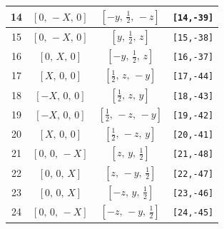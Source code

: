 \documentclass[fleqn,8pt]{jsarticle}
\begin{document}
\begin{longtable}{cccc}
14 & $\left[ 0,\, - X,\, 0 \right]$ & $\left[ - y,\, \frac{1}{2},\, - z \right]$ & {\tt [14,-39]} \\ \hline
15 & $\left[ 0,\, - X,\, 0 \right]$ & $\left[ y,\, \frac{1}{2},\, z \right]$ & {\tt [15,-38]} \\ \hline
16 & $\left[ 0,\, X,\, 0 \right]$ & $\left[ - y,\, \frac{1}{2},\, z \right]$ & {\tt [16,-37]} \\ \hline
17 & $\left[ X,\, 0,\, 0 \right]$ & $\left[ \frac{1}{2},\, z,\, - y \right]$ & {\tt [17,-44]} \\ \hline
18 & $\left[ - X,\, 0,\, 0 \right]$ & $\left[ \frac{1}{2},\, z,\, y \right]$ & {\tt [18,-43]} \\ \hline
19 & $\left[ - X,\, 0,\, 0 \right]$ & $\left[ \frac{1}{2},\, - z,\, - y \right]$ & {\tt [19,-42]} \\ \hline
20 & $\left[ X,\, 0,\, 0 \right]$ & $\left[ \frac{1}{2},\, - z,\, y \right]$ & {\tt [20,-41]} \\ \hline
21 & $\left[ 0,\, 0,\, - X \right]$ & $\left[ z,\, y,\, \frac{1}{2} \right]$ & {\tt [21,-48]} \\ \hline
22 & $\left[ 0,\, 0,\, X \right]$ & $\left[ z,\, - y,\, \frac{1}{2} \right]$ & {\tt [22,-47]} \\ \hline
23 & $\left[ 0,\, 0,\, X \right]$ & $\left[ - z,\, y,\, \frac{1}{2} \right]$ & {\tt [23,-46]} \\ \hline
24 & $\left[ 0,\, 0,\, - X \right]$ & $\left[ - z,\, - y,\, \frac{1}{2} \right]$ & {\tt [24,-45]} \\
\end{longtable}
\renewcommand{\arraystretch}{1.2}
\end{document}
